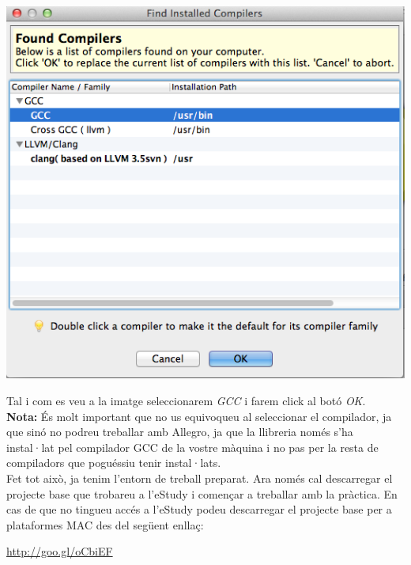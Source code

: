 \documentclass[11pt]{article}
\begin{document}
\begin{center}
	\includegraphics[scale=0.5]{img/Compiler_Selection.png}
\end{center}

\noindent Tal i com es veu a la imatge seleccionarem \textit{GCC} i farem click al botó \textit{OK}.\\


\noindent \textbf{Nota:} És molt important que no us equivoqueu al seleccionar el compilador, ja que sinó no podreu treballar amb Allegro, ja que la llibreria només s'ha instal·lat pel compilador GCC de la vostre màquina i no pas per la resta de compiladors que poguéssiu tenir instal·lats.\\

\noindent Fet tot això, ja tenim l'entorn de treball preparat. Ara només cal descarregar el projecte base que trobareu a l'eStudy i començar a treballar amb la pràctica. En cas de que no tingueu accés a l'eStudy podeu descarregar el projecte base per a plataformes MAC des del següent enllaç:

\begin{center}
	\url{http://goo.gl/oCbiEF}
\end{center}
\end{document}
